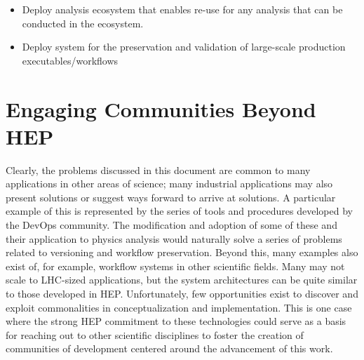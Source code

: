 \documentclass[11pt]{article}
\begin{document}
\begin{itemize}
\item
Deploy analysis ecosystem that enables re-use for any analysis that can be conducted in the ecosystem.
\item
Deploy system for the preservation and validation of large-scale production executables/workflows
\end{itemize}

\hypertarget{engage}{%
\section{Engaging Communities Beyond HEP}\label{engage}}
Clearly, the problems discussed in this document are common to many applications in other areas of science; many industrial applications may also present solutions or suggest ways forward to arrive at solutions. A particular example of this is represented by the series of tools and procedures developed by the DevOps community.  The modification and adoption of some of these and their application to physics analysis would naturally solve a series of problems related to versioning and workflow preservation.  Beyond this, many examples also exist of, for example, workflow systems in other scientific fields.  Many may not scale to LHC-sized applications, but the system architectures can be quite similar to those developed in HEP.  Unfortunately, few opportunities exist to discover and exploit commonalities in conceptualization and implementation.  This is one case where the strong HEP commitment to these technologies could serve as a basis for reaching out to other scientific disciplines to foster the creation of communities of development centered around the advancement of this work.



\newpage
\end{document}
